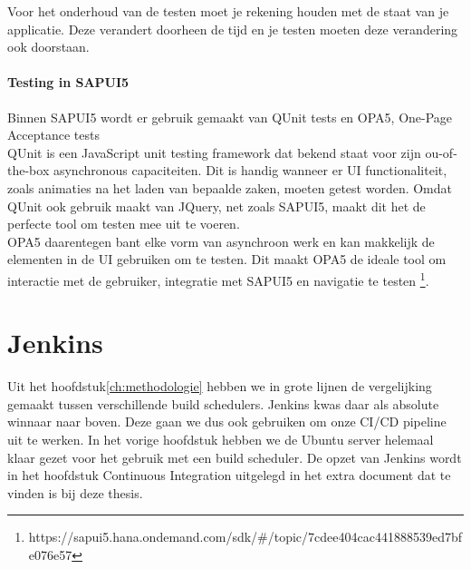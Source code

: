 Voor het onderhoud van de testen moet je rekening houden met de staat van je applicatie. Deze verandert doorheen de tijd en je testen moeten deze verandering ook doorstaan.

    \paragraph{Testing in SAPUI5}
    Binnen SAPUI5 wordt er gebruik gemaakt van QUnit tests en OPA5, One-Page Acceptance tests\\
    QUnit is een JavaScript unit testing framework dat bekend staat voor zijn ou-of-the-box asynchronous capaciteiten. Dit is handig wanneer er UI functionaliteit, zoals animaties na het laden van bepaalde zaken, moeten getest worden. Omdat QUnit ook gebruik maakt van JQuery, net zoals SAPUI5, maakt dit het de perfecte tool om testen mee uit te voeren.\\
    OPA5 daarentegen bant elke vorm van asynchroon werk en kan makkelijk de elementen in de UI gebruiken om te testen. Dit maakt OPA5 de ideale tool om interactie met de gebruiker, integratie met SAPUI5 en navigatie te testen \footnote{https://sapui5.hana.ondemand.com/sdk/#/topic/7cdee404cac441888539ed7bfe076e57}.

\section{Jenkins}
\label{sec:short-list}
Uit het hoofdstuk\ref{ch:methodologie} hebben we in grote lijnen de vergelijking gemaakt tussen verschillende build schedulers. Jenkins kwas daar als absolute winnaar naar boven. Deze gaan we dus ook gebruiken om onze CI/CD pipeline uit te werken.
In het vorige hoofdstuk hebben we de Ubuntu server helemaal klaar gezet voor het gebruik met een build scheduler. De opzet van Jenkins wordt in het hoofdstuk Continuous Integration uitgelegd in het extra document dat te vinden is bij deze thesis.

